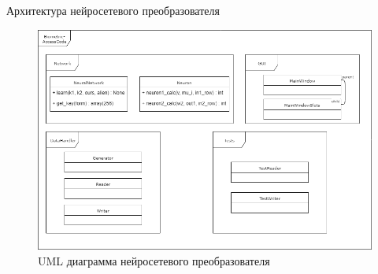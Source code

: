 \begin{frame}{Архитектура нейросетевого преобразователя}
	\begin{figure}
        \includegraphics[width=\textwidth]{img/nn_uml.png}
        \caption{UML диаграмма нейросетевого преобразователя}
    \end{figure}
\end{frame}
